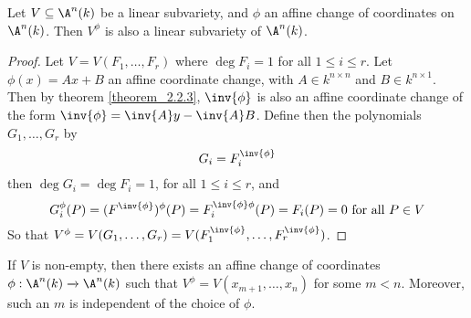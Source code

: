 \begin{proposition}\label{proposition_2.2.4}
  Let $V \subseteq \A^n(k)$ be a linear subvariety, and $\phi$ an affine change
  of coordinates on $\A^n(k)$. Then $V^\phi$ is also a linear subvariety of
  $\A^n(k)$.
\end{proposition}
\begin{proof}
  Let $V=V(F_1, \dots, F_r)$ where $\deg{F_i}=1$ for all $1 \leq i \leq r$. Let
  $\phi(x)=Ax+B$ an affine coordinate change, with $A \in k^{n \times n}$ and
  $B \in k^{n \times 1}$. Then by theorem \ref{theorem_2.2.3}, $\inv{\phi}$ is
  also an affine coordinate change of the form $\inv{\phi}=\inv{A}y-\inv{A}B$.
  Define then the polynomials $G_1, \dots, G_r$ by
  \begin{equation*}
    G_i=F_i^{\inv{\phi}}
  \end{equation*}
  then $\deg{G_i}=\deg{F_i}=1$, for all $1 \leq i \leq r$, and
  \begin{equation*}
    G_i^{\phi}(P)=(F^{\inv{\phi}})^{\phi}(P)=F_i^{\inv{\phi}\phi}(P)=F_i(P)=0
    \text{ for all } P \in V
  \end{equation*}
  So that $V^\phi=V(G_1, \dots, G_r)=V(F_1^{\inv{\phi}}, \dots,
  F_r^{\inv{\phi}})$.
\end{proof}
\begin{corollary}
  If $V$ is non-empty, then there exists an affine change of coordinates
  $\phi:\A^n(k) \xrightarrow{} \A^n(k)$ such that $V^\phi=V(x_{m+1}, \dots,
  x_n)$ for some $m<n$. Moreover, such an $m$ is independent of the choice of
  $\phi$.
\end{corollary}
